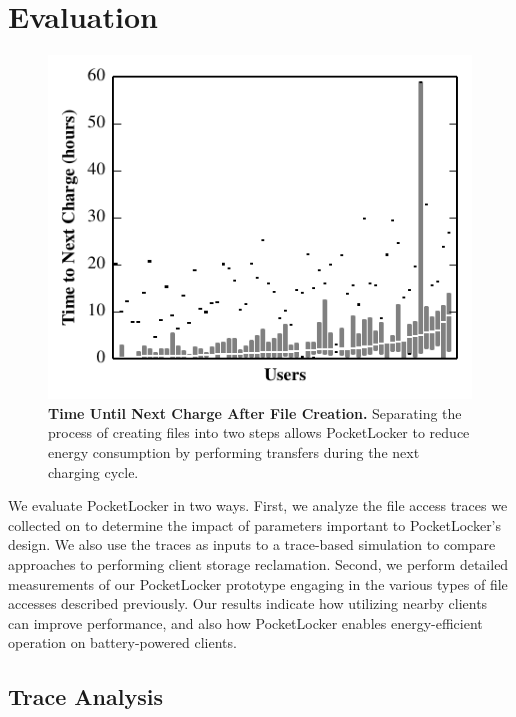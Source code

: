 
\section{Evaluation}
\label{sec-evaluation}

\begin{figure}[t]
  \includegraphics{./figures/pocketlocker/BatteryLengthDistributionGraph.pdf}
  
  \caption{\small \textbf{Time Until Next Charge After File Creation.}
    Separating the process of creating files into two steps allows
  PocketLocker to reduce energy consumption by performing transfers during
the next charging cycle.}
  
  \label{fig-simulation-battery}

  \vspace*{-0.2in}
\end{figure}

We evaluate PocketLocker in two ways. First, we analyze the file access
traces we collected on \PhoneLab{} to determine the impact of parameters
important to PocketLocker's design. We also use the traces as inputs to a
trace-based simulation to compare approaches to performing client storage
reclamation. Second, we perform detailed measurements of our PocketLocker
prototype engaging in the various types of file accesses described previously.
Our results indicate how utilizing nearby clients can improve performance, and
also how PocketLocker enables energy-efficient operation on battery-powered
clients.

\subsection{Trace Analysis}
\label{subsec-evaluation-traces}


